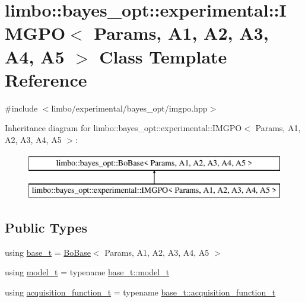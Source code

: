 \hypertarget{classlimbo_1_1bayes__opt_1_1experimental_1_1_i_m_g_p_o}{}\section{limbo\+:\+:bayes\+\_\+opt\+:\+:experimental\+:\+:I\+M\+G\+PO$<$ Params, A1, A2, A3, A4, A5 $>$ Class Template Reference}
\label{classlimbo_1_1bayes__opt_1_1experimental_1_1_i_m_g_p_o}


{\ttfamily \#include $<$limbo/experimental/bayes\+\_\+opt/imgpo.\+hpp$>$}

Inheritance diagram for limbo\+:\+:bayes\+\_\+opt\+:\+:experimental\+:\+:I\+M\+G\+PO$<$ Params, A1, A2, A3, A4, A5 $>$\+:\begin{figure}[H]
\begin{center}
\leavevmode
\includegraphics[height=2.000000cm]{classlimbo_1_1bayes__opt_1_1experimental_1_1_i_m_g_p_o}
\end{center}
\end{figure}
\subsection*{Public Types}
\begin{DoxyCompactItemize}
\item 
using \hyperlink{classlimbo_1_1bayes__opt_1_1experimental_1_1_i_m_g_p_o_a503aab1180ed196b4cdb35befa9b741e}{base\+\_\+t} = \hyperlink{classlimbo_1_1bayes__opt_1_1_bo_base}{Bo\+Base}$<$ Params, A1, A2, A3, A4, A5 $>$
\item 
using \hyperlink{classlimbo_1_1bayes__opt_1_1experimental_1_1_i_m_g_p_o_ae1e0602bec9e133b40e2c171fca8d8de}{model\+\_\+t} = typename \hyperlink{classlimbo_1_1bayes__opt_1_1_bo_base_a5e23d523dd2a16b866a2660721b937bb}{base\+\_\+t\+::model\+\_\+t}
\item 
using \hyperlink{classlimbo_1_1bayes__opt_1_1experimental_1_1_i_m_g_p_o_a794770d90f1ddd8efde68bad804ee5e7}{acquisition\+\_\+function\+\_\+t} = typename \hyperlink{classlimbo_1_1bayes__opt_1_1_bo_base_a5abe502b49e1ee70d5e00f27f95f5dff}{base\+\_\+t\+::acquisition\+\_\+function\+\_\+t}
\end{DoxyCompactItemize}
